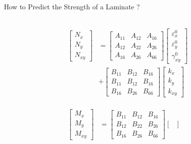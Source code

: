 \documentclass{beamer}
\begin{document}
\begin{frame}{How to Predict the Strength of a Laminate ?\hfill }
    \begin{columns}[c]
	\begin{column}{0.6\textwidth}
		\begin{equation} \label{eq:force_and_moments}
			\begin{array}{l}
				\begin{aligned}
			\begin{bmatrix}
				N_x \\
				N_y \\
				N_{xy}
			\end{bmatrix}
			&=
			\begin{bmatrix}
				A_{11} & A_{12} & A_{16} \\
				A_{12} & A_{22} & A_{26} \\
				A_{16} & A_{26} & A_{66} 
			\end{bmatrix}
			\begin{bmatrix}
				\varepsilon_x^0 \\
				\varepsilon_y^0 \\
				\gamma_{xy}^0
			\end{bmatrix}   \\
			&+               
			\begin{bmatrix}
				B_{11} & B_{12} & B_{16} \\
				B_{11} & B_{12} & B_{16} \\
				B_{16} & B_{26} & B_{66} 
			\end{bmatrix}
			\begin{bmatrix}
				k_x \\
				k_y \\
				k_{xy} 
			\end{bmatrix}  \\
		\end{aligned} \\ \\
		\begin{aligned}
			\begin{bmatrix}
				M_x \\
				M_y \\
				M_{xy}
			\end{bmatrix}
			&=
			\begin{bmatrix}
				B_{11} & B_{12} & B_{16} \\
				B_{12} & B_{22} & B_{26} \\
				B_{16} & B_{26} & B_{66} 
			\end{bmatrix}
			\begin{bmatrix}

\end{bmatrix}
\end{aligned}
\end{array}
\end{equation}
\end{column}
\end{columns}
\end{frame}
\end{document}

